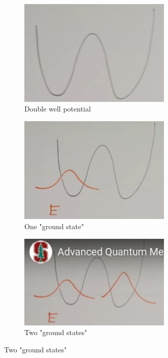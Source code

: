 \documentclass[]{article}
\begin{document}
\begin{figure}[H]
	\caption{Double well potential with very high barrier}
	\begin{subfigure}{0.3\textwidth}
		\caption{Double well potential}\label{fig:aqm-7-potential}
		\includegraphics[width=0.8\textwidth]{aqm-7-potential}
	\end{subfigure}
	\begin{subfigure}{0.3\textwidth}
		\caption{One "ground state"}\label{fig:particle_mixed_left}
		\includegraphics[width=0.8\textwidth]{particle_mixed_left}
	\end{subfigure}
	\begin{subfigure}{0.3\textwidth}
		\caption{Two "ground states"}\label{fig:double:well}
		\includegraphics[width=0.8\textwidth]{particle_mixed}
	\end{subfigure}
\end{figure}
\end{document}
